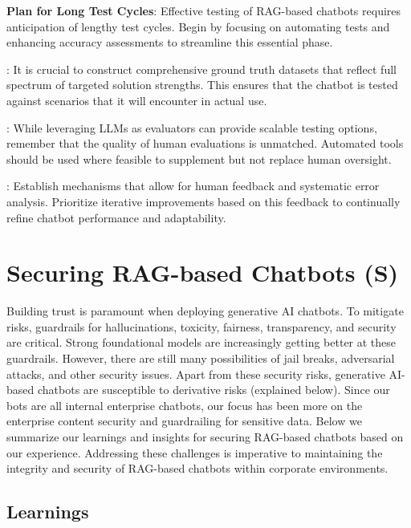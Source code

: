 \documentclass[sigconf]{acmart}
\begin{document}
\textbf{Plan for Long Test Cycles}: Effective testing of RAG-based chatbots requires anticipation of lengthy test cycles. Begin by focusing on automating tests and enhancing accuracy assessments to streamline this essential phase.

: It is crucial to construct comprehensive ground truth datasets that reflect full spectrum of targeted solution strengths. This ensures that the chatbot is tested against scenarios that it will encounter in actual use.

: While leveraging LLMs as evaluators can provide scalable testing options, remember that the quality of human evaluations is unmatched. Automated tools should be used where feasible to supplement but not replace human oversight.

: Establish mechanisms that allow for  human feedback and systematic error analysis. Prioritize iterative improvements based on this feedback to continually refine chatbot performance and adaptability.

\vspace{-3mm}
\section {Securing RAG-based Chatbots (S)}

Building trust is paramount when deploying generative AI chatbots. To mitigate risks, guardrails for hallucinations, toxicity, fairness, transparency, and security are critical. Strong foundational models are increasingly getting better at these guardrails. However, there are still many possibilities of jail breaks, adversarial attacks, and other security issues. Apart from these security risks, generative AI-based chatbots are susceptible to derivative risks (explained below). Since our bots are all internal enterprise chatbots, our focus has been more on the enterprise content security and guardrailing for sensitive data. Below we summarize our learnings and insights for securing RAG-based chatbots based on our experience. Addressing these challenges is imperative to maintaining the integrity and security of RAG-based chatbots within corporate environments.

\vspace{-1mm}
\subsection{Learnings}
\end{document}
